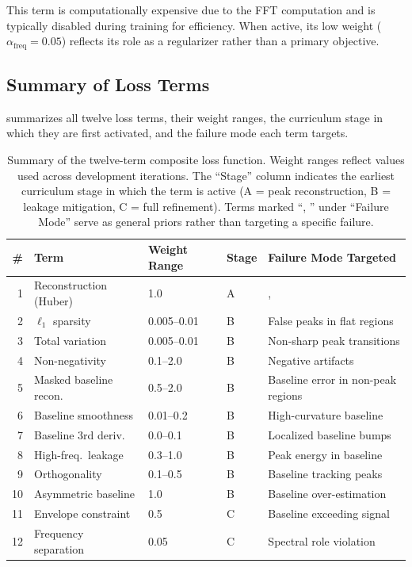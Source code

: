 This term is computationally expensive due to the FFT computation and is typically disabled during training for efficiency. When active, its low weight ($\alpha_{\text{freq}} = 0.05$) reflects its role as a regularizer rather than a primary objective.


\subsection{Summary of Loss Terms}
\label{sec:method_loss_summary}

 summarizes all twelve loss terms, their weight ranges, the curriculum stage in which they are first activated, and the failure mode each term targets.

\begin{table}[t]
    \centering
    \caption{Summary of the twelve-term composite loss function. Weight ranges reflect values used across development iterations. The ``Stage'' column indicates the earliest curriculum stage in which the term is active (A = peak reconstruction, B = leakage mitigation, C = full refinement). Terms marked ``, '' under ``Failure Mode'' serve as general priors rather than targeting a specific failure.}
    \label{tab:loss_terms}
    \small
    \begin{tabular}{@{}rlllp{4.0cm}@{}}
        \toprule
        \textbf{\#} & \textbf{Term} & \textbf{Weight Range} & \textbf{Stage} & \textbf{Failure Mode Targeted} \\
        \midrule
        1 & Reconstruction (Huber) & 1.0 & A & ,  \\
        2 & $\ell_1$ sparsity & 0.005--0.01 & B & False peaks in flat regions \\
        3 & Total variation & 0.005--0.01 & B & Non-sharp peak transitions \\
        4 & Non-negativity & 0.1--2.0 & B & Negative artifacts \\
        5 & Masked baseline recon. & 0.5--2.0 & B & Baseline error in non-peak regions \\
        6 & Baseline smoothness & 0.01--0.2 & B & High-curvature baseline \\
        7 & Baseline 3rd deriv. & 0.0--0.1 & B & Localized baseline bumps \\
        8 & High-freq.\ leakage & 0.3--1.0 & B & Peak energy in baseline \\
        9 & Orthogonality & 0.1--0.5 & B & Baseline tracking peaks \\
        10 & Asymmetric baseline & 1.0 & B & Baseline over-estimation \\
        11 & Envelope constraint & 0.5 & C & Baseline exceeding signal \\
        12 & Frequency separation & 0.05 & C & Spectral role violation \\
        \bottomrule
    \end{tabular}
\end{table}

